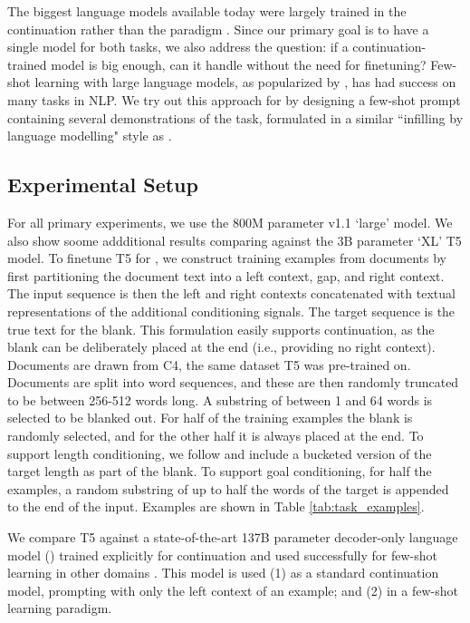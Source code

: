 The biggest language models available today were largely trained in the continuation rather than the \FitB{} paradigm \citep{gpt3,gpt-neo}.
Since our primary goal is to have a single model for both tasks, we also address the question: if a continuation-trained model is big enough, can it handle \FitB{} without the need for finetuning?
Few-shot learning with large language models, as popularized by \citet{gpt3}, has had success on many tasks in NLP.
We try out this approach for \FitB{} by designing a few-shot prompt containing several demonstrations of the \FitB{} task, formulated in a similar ``infilling by language modelling" style as \citet{donahue2020enabling}.

\subsection{Experimental Setup}
For all primary experiments, we use the 800M parameter v1.1 `large' model.
We also show soome addditional results comparing against the 3B parameter `XL' T5 model.
To finetune T5 for \FitB, we construct training examples from documents by first partitioning the document text into a left context, gap, and right context.
The input sequence is then the left and right contexts concatenated with textual representations of the additional conditioning signals.
The target sequence is the true text for the blank.
This formulation easily supports continuation, as the blank can be deliberately placed at the end (i.e., providing no right context).
Documents are drawn from C4, the same dataset T5 was pre-trained on.
Documents are split into word sequences, and these are then randomly truncated to be between 256-512 words long.
A substring of between 1 and 64 words is selected to be blanked out.
For half of the training examples the blank is randomly selected, and for the other half it is always placed at the end.
To support length conditioning, we follow \citet{roberts2020exploring} and include a bucketed version of the target length as part of the blank.
To support goal conditioning, for half the examples, a random substring of up to half the words of the target is appended to the end of the input.
Examples are shown in Table \ref{tab:task_examples}.

We compare T5 against a state-of-the-art 137B parameter decoder-only language model (\LLM{}) trained explicitly for continuation and used successfully for few-shot learning in other domains \citep{austin2021program,reif2021recipe}.
This model is used (1) as a standard continuation model, prompting with only the left context of an example; and (2) in a few-shot learning paradigm.

